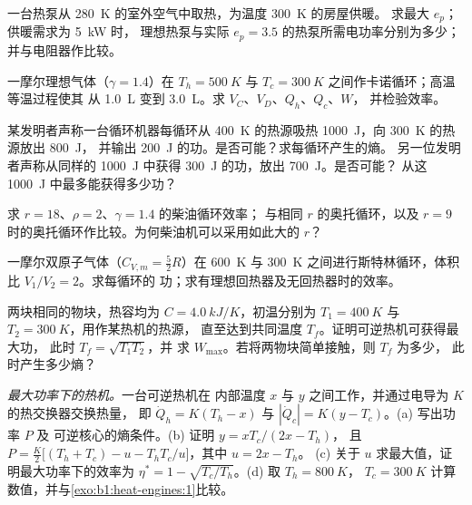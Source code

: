 \begin{exercise}[$\star$]\label{exo:b1:heat-engines:4}
一台热泵从 \qty{280}{K} 的室外空气中取热，为温度 \qty{300}{K} 的房屋供暖。
求最大 $e_p$；供暖需求为 \qty{5}{kW} 时，
理想热泵与实际 $e_p = 3.5$ 的热泵所需电功率分别为多少；
并与电阻器作比较。
\end{exercise}

\begin{exercise}[$\star\star$]\label{exo:b1:heat-engines:5}
一摩尔理想气体（$\gamma = 1.4$）在
$T_h = \qty{500}{K}$ 与 $T_c = \qty{300}{K}$ 之间作卡诺循环；高温等温过程使其
从 \qty{1.0}{L} 变到 \qty{3.0}{L}。求 $V_C$、$V_D$、$Q_h$、$Q_c$、$W$，
并检验效率。
\end{exercise}

\begin{exercise}[$\star\star$]\label{exo:b1:heat-engines:6}
某发明者声称一台循环机器每循环从
\qty{400}{K} 的热源吸热 \qty{1000}{J}，向 \qty{300}{K} 的热源放出 \qty{800}{J}，
并输出 \qty{200}{J} 的功。是否可能？求每循环产生的熵。
另一位发明者声称从同样的
\qty{1000}{J} 中获得 \qty{300}{J} 的功，放出 \qty{700}{J}。是否可能？
从这 \qty{1000}{J} 中最多能获得多少功？
\end{exercise}

\begin{exercise}[$\star\star$]\label{exo:b1:heat-engines:7}
求 $r = 18$、$\rho = 2$、$\gamma = 1.4$ 的柴油循环效率；
与相同 $r$ 的奥托循环，以及
$r = 9$ 时的奥托循环作比较。为何柴油机可以采用如此大的 $r$？
\end{exercise}

\begin{exercise}[$\star\star$]\label{exo:b1:heat-engines:8}
一摩尔双原子气体（$C_{V,m} = \tfrac52R$）在
\qty{600}{K} 与 \qty{300}{K} 之间进行斯特林循环，体积比 $V_1/V_2 = 2$。求每循环的
功；求有理想回热器及无回热器时的效率。
\end{exercise}

\begin{exercise}[$\star\star$]\label{exo:b1:heat-engines:9}
两块相同的物块，热容均为 $C = \qty{4.0}{kJ/K}$，初温分别为 $T_1 =
\qty{400}{K}$ 与 $T_2 = \qty{300}{K}$，用作某热机的热源，
直至达到共同温度 $T_f$。证明可逆热机可获得最大功，
此时 $T_f = \sqrt{T_1T_2}$，并
求 $W_{\max}$。若将两物块简单接触，则 $T_f$ 为多少，
此时产生多少熵？
\end{exercise}

\begin{exercise}[$\star\star\star$]\label{exo:b1:heat-engines:10}
\emph{最大功率下的热机。}一台可逆热机在
内部温度 $x$ 与 $y$ 之间工作，并通过电导为 $K$ 的热交换器交换热量，
即 $\dot Q_h = K(T_h - x)$ 与
$|\dot Q_c| = K(y - T_c)$。(a) 写出功率 $P$ 及
可逆核心的熵条件。(b) 证明 $y = xT_c/(2x - T_h)$，
且 $P = \frac{K}{2}\bigl[(T_h + T_c) - u - T_hT_c/u\bigr]$，其中 $u = 2x - T_h$。
(c) 关于 $u$ 求最大值，证明最大功率下的效率为
$\eta^\ast = 1 - \sqrt{T_c/T_h}$。(d) 取 $T_h = \qty{800}{K}$，
$T_c = \qty{300}{K}$ 计算数值，并与\cref{exo:b1:heat-engines:1}比较。
\end{exercise}

